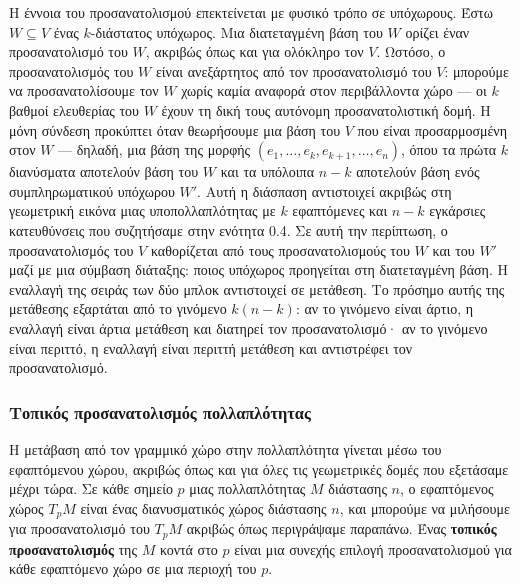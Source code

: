 \documentclass[11pt,a4paper,twoside,openright]{book}
\begin{document}
Η έννοια του προσανατολισμού επεκτείνεται με φυσικό τρόπο σε υπόχωρους. Έστω $W \subseteq V$ ένας $k$-διάστατος υπόχωρος. Μια διατεταγμένη βάση του $W$ ορίζει έναν προσανατολισμό του $W$, ακριβώς όπως και για ολόκληρο τον $V$. Ωστόσο, ο προσανατολισμός του $W$ είναι ανεξάρτητος από τον προσανατολισμό του $V$: μπορούμε να προσανατολίσουμε τον $W$ χωρίς καμία αναφορά στον περιβάλλοντα χώρο --- οι $k$ βαθμοί ελευθερίας του $W$ έχουν τη δική τους αυτόνομη προσανατολιστική δομή. Η μόνη σύνδεση προκύπτει όταν θεωρήσουμε μια βάση του $V$ που είναι προσαρμοσμένη στον $W$ --- δηλαδή, μια βάση της μορφής $(e_1, \dots, e_k, e_{k+1}, \dots, e_n)$, όπου τα πρώτα $k$ διανύσματα αποτελούν βάση του $W$ και τα υπόλοιπα $n-k$ αποτελούν βάση ενός συμπληρωματικού υπόχωρου $W'$. Αυτή η διάσπαση αντιστοιχεί ακριβώς στη γεωμετρική εικόνα μιας υποπολλαπλότητας με $k$ εφαπτόμενες και $n-k$ εγκάρσιες κατευθύνσεις που συζητήσαμε στην ενότητα 0.4. Σε αυτή την περίπτωση, ο προσανατολισμός του $V$ καθορίζεται από τους προσανατολισμούς του $W$ και του $W'$ μαζί με μια σύμβαση διάταξης: ποιος υπόχωρος προηγείται στη διατεταγμένη βάση. Η εναλλαγή της σειράς των δύο μπλοκ αντιστοιχεί σε μετάθεση. Το πρόσημο αυτής της μετάθεσης εξαρτάται από το γινόμενο $k(n-k)$: αν το γινόμενο είναι άρτιο, η εναλλαγή είναι άρτια μετάθεση και διατηρεί τον προσανατολισμό· αν το γινόμενο είναι περιττό, η εναλλαγή είναι περιττή μετάθεση και αντιστρέφει τον προσανατολισμό.

\subsubsection{Τοπικός προσανατολισμός πολλαπλότητας}

Η μετάβαση από τον γραμμικό χώρο στην πολλαπλότητα γίνεται μέσω του εφαπτόμενου χώρου, ακριβώς όπως και για όλες τις γεωμετρικές δομές που εξετάσαμε μέχρι τώρα. Σε κάθε σημείο $p$ μιας πολλαπλότητας $M$ διάστασης $n$, ο εφαπτόμενος χώρος $T_pM$ είναι ένας διανυσματικός χώρος διάστασης $n$, και μπορούμε να μιλήσουμε για προσανατολισμό του $T_pM$ ακριβώς όπως περιγράψαμε παραπάνω. Ένας \textbf{τοπικός προσανατολισμός} της $M$ κοντά στο $p$ είναι μια συνεχής επιλογή προσανατολισμού για κάθε εφαπτόμενο χώρο σε μια περιοχή του $p$.
\end{document}
